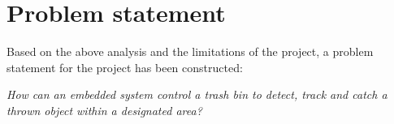 \section{Problem statement}
\label{sec:Problem statement}
Based on the above analysis and the limitations of the project, a problem statement for the project has been constructed:

\textit{How can an embedded system control a trash bin to detect, track and catch a thrown object within a designated area?}


